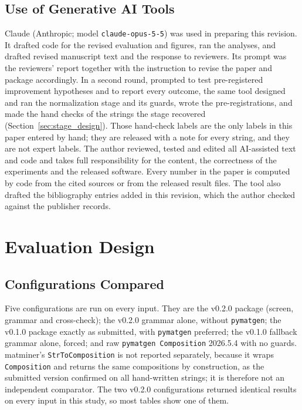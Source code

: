 \documentclass[10pt,journal]{IEEEtran}
\newcommand{\pmg}{\texttt{pymatgen}\xspace}
\begin{document}
\subsection{Use of Generative AI Tools}
\label{sec:ai}
Claude (Anthropic; model \texttt{claude-opus-5-5}) was used in preparing this revision. It drafted code for the revised evaluation and figures, ran the analyses, and drafted revised manuscript text and the response to reviewers. Its prompt was the reviewers' report together with the instruction to revise the paper and package accordingly. In a second round, prompted to test pre-registered improvement hypotheses and to report every outcome, the same tool designed and ran the normalization stage and its guards, wrote the pre-registrations, and made the hand checks of the strings the stage recovered (Section~\ref{sec:stage_design}). Those hand-check labels are the only labels in this paper entered by hand; they are released with a note for every string, and they are not expert labels. The author reviewed, tested and edited all AI-assisted text and code and takes full responsibility for the content, the correctness of the experiments and the released software. Every number in the paper is computed by code from the cited sources or from the released result files. The tool also drafted the bibliography entries added in this revision, which the author checked against the publisher records.

\section{Evaluation Design}
\label{sec:setup}

\subsection{Configurations Compared}
Five configurations are run on every input. They are the v0.2.0 package (screen, grammar and cross-check); the v0.2.0 grammar alone, without \pmg; the v0.1.0 package exactly as submitted, with \pmg preferred; the v0.1.0 fallback grammar alone, forced; and raw \pmg~\texttt{Composition} 2026.5.4 with no guards. matminer's \texttt{StrToComposition} is not reported separately, because it wraps \texttt{Composition} and returns the same compositions by construction, as the submitted version confirmed on all \NBench{} hand-written strings; it is therefore not an independent comparator. The two v0.2.0 configurations returned identical results on every input in this study, so most tables show one of them.
\end{document}
